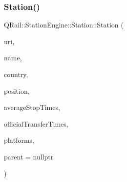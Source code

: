 \mbox{\label{classQRail_1_1StationEngine_1_1Station_a14101dfd927e5bfd379a4121abaef363}} 
\subsubsection{\texorpdfstring{Station()}{Station()}\hspace{0.1cm}{\footnotesize\ttfamily [4/5]}}
{\footnotesize\ttfamily Q\+Rail\+::\+Station\+Engine\+::\+Station\+::\+Station (\begin{DoxyParamCaption}\item[{const Q\+Url \&}]{uri,  }\item[{const Q\+Map$<$ Q\+Locale\+::\+Language, Q\+String $>$ \&}]{name,  }\item[{const Q\+Locale\+::\+Country \&}]{country,  }\item[{const Q\+Geo\+Coordinate \&}]{position,  }\item[{const qreal \&}]{average\+Stop\+Times,  }\item[{const quint32 \&}]{official\+Transfer\+Times,  }\item[{const Q\+Map$<$ Q\+Url, Q\+String $>$ \&}]{platforms,  }\item[{Q\+Object $\ast$}]{parent = {\ttfamily nullptr} }\end{DoxyParamCaption})\hspace{0.3cm}{\ttfamily [explicit]}}

\mbox{\label{classQRail_1_1StationEngine_1_1Station_a023b5e1eb99a74a1ec1383c7f724e200}} 
